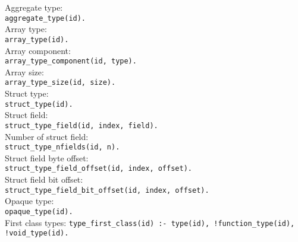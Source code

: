 Aggregate type:\\
\tab \lstinline{aggregate_type(id).}
\\
Array type:\\
\tab \lstinline{array_type(id).}
\\
Array component:\\
\tab \lstinline{array_type_component(id, type).}
\\
Array size:\\
\tab \lstinline{array_type_size(id, size).}
\\
Struct type:\\
\tab \lstinline{struct_type(id).}
\\
Struct field:\\
\tab \lstinline{struct_type_field(id, index, field).}
\\
Number of struct field:\\
\tab \lstinline{struct_type_nfields(id, n).}
\\
Struct field byte offset:\\
\tab \lstinline{struct_type_field_offset(id, index, offset).}
\\
Struct field bit offset:\\
\tab \lstinline{struct_type_field_bit_offset(id, index, offset).}
\\
Opaque type:\\
\tab \lstinline{opaque_type(id).}
\\
First class types:
\tab \lstinline{type_first_class(id) :- type(id), !function_type(id), !void_type(id).}
